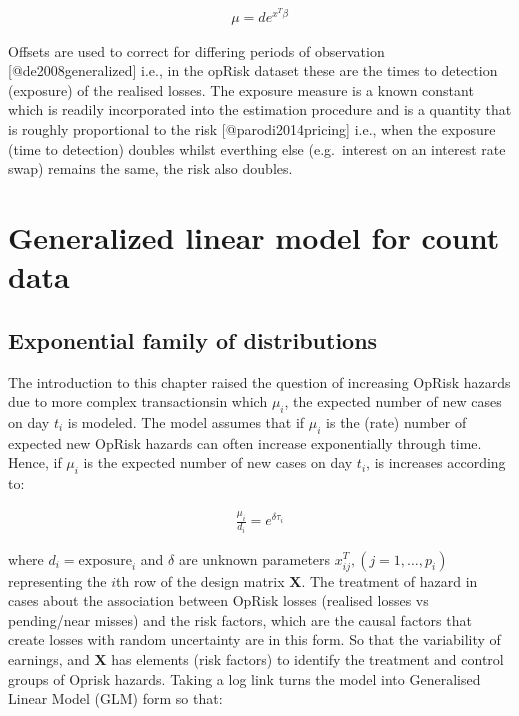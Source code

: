 \documentclass[]{article}
\begin{document}
\singlespacing

\begin{eqnarray}
\mu = d e^{x^T\beta}
\end{eqnarray} \doublespacing

Offsets are used to correct for differing periods of observation
{[}@de2008generalized{]} i.e., in the opRisk dataset these are the times
to detection (exposure) of the realised losses. The exposure measure is
a known constant which is readily incorporated into the estimation
procedure and is a quantity that is roughly proportional to the risk
{[}@parodi2014pricing{]} i.e., when the exposure (time to detection)
doubles whilst everthing else (e.g.~interest on an interest rate swap)
remains the same, the risk also doubles.

\section{Generalized linear model for count data}
\label{sec:Generalized linear model for count data}

\subsection{Exponential family of distributions}

The introduction to this chapter raised the question of increasing
OpRisk hazards due to more complex transactionsin which \(\mu_i\), the
expected number of new cases on day \(t_i\) is modeled. The model
assumes that if \(\mu_i\) is the (rate) number of expected new OpRisk
hazards can often increase exponentially through time. Hence, if
\(\mu_i\) is the expected number of new cases on day \(t_i\), is
increases according to:

\singlespacing

\begin{eqnarray}\label{expgrowth}
\frac{\mu_i}{d_i} = e^{\delta\tau_i} \nonumber
\end{eqnarray} \doublespacing

where \(d_i = \mbox{exposure}_i\) and \(\delta\) are unknown parameters
\(x_{ij}^T, (j=1,\ldots,p_i)\) representing the \(i\)th row of the
design matrix \(\mathbf{X}\). The treatment of hazard in cases about the
association between OpRisk losses (realised losses vs pending/near
misses) and the risk factors, which are the causal factors that create
losses with random uncertainty are in this form. So that the variability
of earnings, and \(\mathbf{X}\) has elements (risk factors) to identify
the treatment and control groups of Oprisk hazards. Taking a log link
turns the model into Generalised Linear Model (GLM) form so that:
\end{document}
